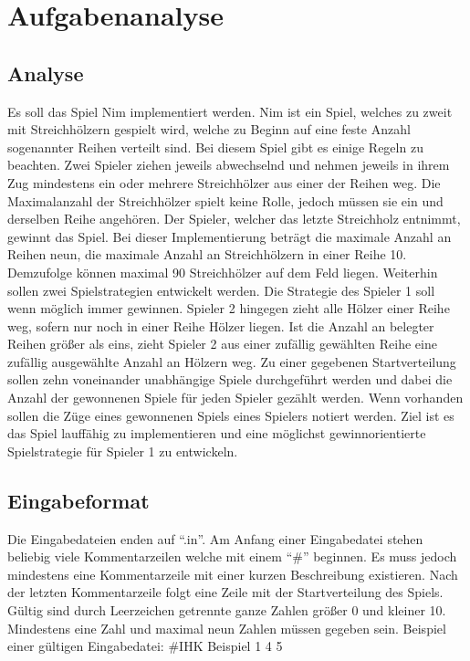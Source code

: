 \chapter{Aufgabenanalyse}
\label{chap:Aufgabenanalyse}

\section{Analyse}
Es soll das Spiel Nim implementiert werden. Nim ist ein Spiel, welches zu zweit mit Streichhölzern gespielt wird, welche zu Beginn auf eine feste Anzahl sogenannter Reihen verteilt sind. Bei diesem Spiel gibt es einige Regeln zu beachten. Zwei Spieler ziehen jeweils abwechselnd und nehmen jeweils in ihrem Zug mindestens ein oder mehrere Streichhölzer aus einer der Reihen weg. Die Maximalanzahl der Streichhölzer spielt keine Rolle, jedoch
müssen sie ein und derselben Reihe angehören. Der Spieler, welcher das letzte Streichholz entnimmt, gewinnt das Spiel. \newline
Bei dieser Implementierung beträgt die maximale Anzahl an Reihen neun, die maximale Anzahl an Streichhölzern in einer Reihe 10. Demzufolge können maximal 90 Streichhölzer auf dem Feld liegen. Weiterhin sollen zwei Spielstrategien entwickelt werden. Die Strategie des Spieler 1 soll wenn möglich immer gewinnen. Spieler 2 hingegen zieht alle Hölzer einer Reihe
weg, sofern nur noch in einer Reihe Hölzer liegen. Ist die Anzahl an belegter Reihen größer als eins, zieht Spieler 2 aus einer zufällig gewählten Reihe eine zufällig ausgewählte Anzahl an Hölzern weg. \newline
Zu einer gegebenen Startverteilung sollen zehn voneinander unabhängige Spiele
durchgeführt werden und dabei die Anzahl der gewonnenen Spiele für jeden Spieler gezählt werden. Wenn vorhanden sollen die Züge eines gewonnenen Spiels eines Spielers notiert werden. Ziel ist es das Spiel lauffähig zu implementieren und eine möglichst gewinnorientierte Spielstrategie für Spieler 1 zu entwickeln.

\section{Eingabeformat}
Die Eingabedateien enden auf “.in”. Am Anfang einer Eingabedatei stehen beliebig viele
Kommentarzeilen welche mit einem “\#” beginnen. Es muss jedoch mindestens eine
Kommentarzeile mit einer kurzen Beschreibung existieren. Nach der letzten Kommentarzeile
folgt eine Zeile mit der Startverteilung des Spiels. Gültig sind durch Leerzeichen getrennte
ganze Zahlen größer 0 und kleiner 10. Mindestens eine Zahl und maximal neun Zahlen
müssen gegeben sein.
Beispiel einer gültigen Eingabedatei:
\newline
\newline
\#IHK Beispiel 1 4 5	\newline

